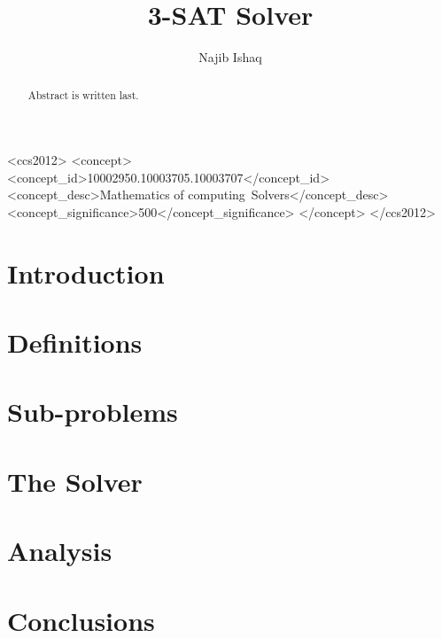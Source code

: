 \documentclass[sigchi]{acmart}
\begin{document}
\title{3-SAT Solver}

\author{Najib Ishaq}

\renewcommand{\shortauthors}{Najib}

\begin{abstract}
    Abstract is written last.
\end{abstract}

\begin{CCSXML}
    <ccs2012>
    <concept>
    <concept_id>10002950.10003705.10003707</concept_id>
    <concept_desc>Mathematics of computing~Solvers</concept_desc>
    <concept_significance>500</concept_significance>
    </concept>
    </ccs2012>
\end{CCSXML}



\maketitle

\section{Introduction}
\label{sec:introduction}


\section{Definitions}
\label{sec:definitions}


\section{Sub-problems}
\label{sec:sub-problems}


\section{The Solver}
\label{sec:the-solver}


\section{Analysis}
\label{sec:analysis}


\section{Conclusions}
\label{sec:conclusions}




\end{document}
